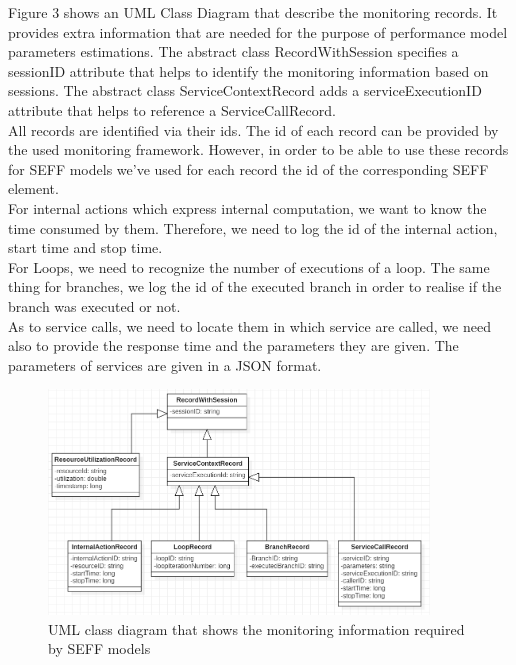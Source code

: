 Figure 3 shows an UML Class Diagram that describe the monitoring records. It provides extra information that are needed for the purpose of performance model parameters estimations. The abstract class RecordWithSession specifies a sessionID attribute that helps to identify the monitoring information based on sessions.  The abstract class ServiceContextRecord adds a serviceExecutionID attribute that helps to reference a ServiceCallRecord.\\

All records are identified via their ids. The id of each record can be provided by the used monitoring framework. However, in order to be able to use these records for SEFF models we’ve used for each record the id of the corresponding SEFF element. \\

For internal actions which express internal computation, we want to know the time consumed by them. Therefore, we need to log the id of the internal action, start time and stop time. \\

For Loops, we need to recognize the number of executions of a loop. The same thing for branches, we log the id of the executed branch in order to realise if the branch was executed or not. \\

As to service calls, we need to locate them in which service are called, we need also to provide the response time and the parameters they are given. The parameters of services are given in a JSON format.\\

\begin{figure}[h]
\centering
\includegraphics[width=0.9\textwidth]{figures/records}
\caption{UML class diagram that shows the monitoring information required by SEFF models}
\label{fig:records}
\end{figure}

